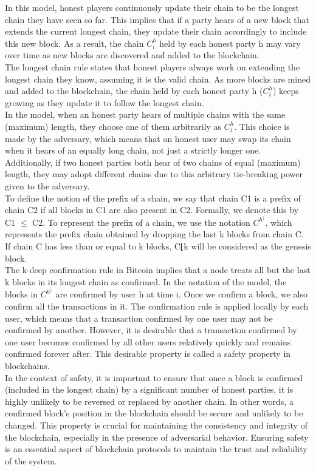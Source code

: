 In this model, honest players continuously update their chain to be the longest chain they have seen so far. This implies that if a party hears of a new block that extends the current longest chain, they update their chain accordingly to include this new block. As a result, the chain $C_{i}^{h}$ held by each honest party h may vary over time as new blocks are discovered and added to the blockchain.\\
The longest chain rule states that honest players always work on extending the longest chain they know, assuming it is the valid chain. As more blocks are mined and added to the blockchain, the chain held by each honest party h ($C_{i}^{h}$) keeps growing as they update it to follow the longest chain.\\
In the model, when an honest party hears of multiple chains with the same (maximum) length, they choose one of them arbitrarily as $C_{i}^{h}$. This choice is made by the adversary, which means that an honest user may swap its chain when it hears of an equally long chain, not just a strictly longer one. Additionally, if two honest parties both hear of two chains of equal (maximum) length, they may adopt different chains due to this arbitrary tie-breaking power given to the adversary.\\
To define the notion of the prefix of a chain, we say that chain C1 is a prefix of chain C2 if all blocks in C1 are also present in C2. Formally, we denote this by C1 $\leq$ C2. To represent the prefix of a chain, we use the notation $C^{h^{⌊}}$, which represents the prefix chain obtained by dropping the last k blocks from chain C. If chain C has less than or equal to k blocks, C⌊k will be considered as the genesis block.\\
The k-deep confirmation rule in Bitcoin implies that a node treats all but the last k blocks in its longest chain as confirmed. In the notation of the model, the blocks in $C^{h^{⌊}}$ are confirmed by user h at time i. Once we confirm a block, we also confirm all the transactions in it. The confirmation rule is applied locally by each user, which means that a transaction confirmed by one user may not be confirmed by another. However, it is desirable that a transaction confirmed by one user becomes confirmed by all other users relatively quickly and remains confirmed forever after. This desirable property is called a safety property in blockchains.\\
In the context of safety, it is important to ensure that once a block is confirmed (included in the longest chain) by a significant number of honest parties, it is highly unlikely to be reversed or replaced by another chain. In other words, a confirmed block's position in the blockchain should be secure and unlikely to be changed. This property is crucial for maintaining the consistency and integrity of the blockchain, especially in the presence of adversarial behavior. Ensuring safety is an essential aspect of blockchain protocols to maintain the trust and reliability of the system.
